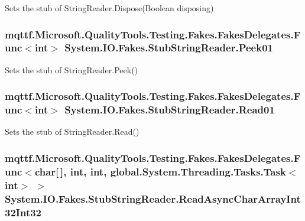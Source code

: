 Sets the stub of String\-Reader.\-Dispose(\-Boolean disposing)

\hypertarget{class_system_1_1_i_o_1_1_fakes_1_1_stub_string_reader_a189f946270fff9c9e67d8f46c3559086}{
\subsubsection[{Peek01}]{\setlength{\rightskip}{0pt plus 5cm}mqttf.\-Microsoft.\-Quality\-Tools.\-Testing.\-Fakes.\-Fakes\-Delegates.\-Func$<$int$>$ System.\-I\-O.\-Fakes.\-Stub\-String\-Reader.\-Peek01}}\label{class_system_1_1_i_o_1_1_fakes_1_1_stub_string_reader_a189f946270fff9c9e67d8f46c3559086}


Sets the stub of String\-Reader.\-Peek()

\hypertarget{class_system_1_1_i_o_1_1_fakes_1_1_stub_string_reader_a77e753f27809c54f6e6ae72092c0f643}{
\subsubsection[{Read01}]{\setlength{\rightskip}{0pt plus 5cm}mqttf.\-Microsoft.\-Quality\-Tools.\-Testing.\-Fakes.\-Fakes\-Delegates.\-Func$<$int$>$ System.\-I\-O.\-Fakes.\-Stub\-String\-Reader.\-Read01}}\label{class_system_1_1_i_o_1_1_fakes_1_1_stub_string_reader_a77e753f27809c54f6e6ae72092c0f643}


Sets the stub of String\-Reader.\-Read()

\hypertarget{class_system_1_1_i_o_1_1_fakes_1_1_stub_string_reader_a5f6e3ad0ce7549ad9a4b0ffa0ab36461}{
\subsubsection[{Read\-Async\-Char\-Array\-Int32\-Int32}]{\setlength{\rightskip}{0pt plus 5cm}mqttf.\-Microsoft.\-Quality\-Tools.\-Testing.\-Fakes.\-Fakes\-Delegates.\-Func$<$char\mbox{[}$\,$\mbox{]}, int, int, global.\-System.\-Threading.\-Tasks.\-Task$<$int$>$ $>$ System.\-I\-O.\-Fakes.\-Stub\-String\-Reader.\-Read\-Async\-Char\-Array\-Int32\-Int32}}\label{class_system_1_1_i_o_1_1_fakes_1_1_stub_string_reader_a5f6e3ad0ce7549ad9a4b0ffa0ab36461}


